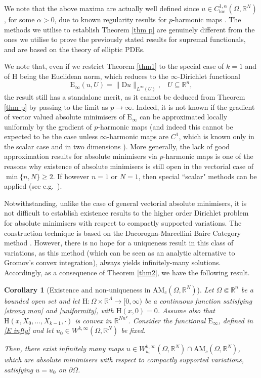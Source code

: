 \documentclass[a4paper,11pt]{article}
\numberwithin{equation}{section}
\newtheorem{Corollary}[Theorem]{Corollary}
\newcommand{\numberset}{\mathbb}
\newcommand{\Om}{\Omega}
\newcommand{\R}{\numberset{R}}
\newcommand{\rom}{\mathrm}
\theoremstyle{definition}
\begin{document}
We note that the above maxima are actually well defined since $u\in C^{1,\alpha}_{\mathrm{loc}}(\Om,\R^N)$, for some $\alpha>0$, due to known regularity results for $p$-harmonic maps \cite{U}. The methods we utilise to establish Theorem \ref{thm p} are genuinely different from the ones we utilise to prove the previously stated results for supremal functionals, and are based on the theory of elliptic PDEs.

We note that, even if we restrict Theorem \ref{thm1} to the special case of $k=1$ and of $\mathrm H$ being the Euclidean norm, which reduces to the $\infty$-Dirichlet functional 
\[
\mathrm E_\infty(u,U)=\|\rom D u\|_{L^\infty(U)},  \ \ \ \ U\subseteq \R^n,
\]
the result still has a standalone merit, as it cannot be deduced from Theorem \ref{thm p} by passing to the limit as $p\to \infty$. Indeed, it is not known if the gradient of vector valued absolute minimisers of $\mathrm E_\infty$ can be approximated locally uniformly by the gradient of $p$-harmonic maps (and indeed this cannot be expected to be the case unless $\infty$-harmonic maps are $C^1$, which is known only in the scalar case and in two dimensions \cite{ES}). More generally, the lack of good approximation results for absolute minimisers via $p$-harmonic maps is one of the reasons why existence of absolute minimisers is still open in the vectorial case of $\min\{n,N\}\geq 2$. If however $n=1$ or $N=1$, then special ``scalar" methods can be applied (see e.g.\ \cite{BJW,AK,K6}).

Notwithstanding, unlike the case of general vectorial absolute minimisers, it is not difficult to establish existence results to the higher order Dirichlet problem for absolute minimisers with respect to compactly supported variations. The construction technique is based on the Dacorogna-Marcellini Baire Category method \cite{D-M}. However, there is no hope for a uniqueness result in this class of variations, as this method (which can be seen as an analytic alternative to Gromov's convex integration), always yields infinitely-many solutions. Accordingly, as a consequence of Theorem \ref{thm2}, we have the following result.



\begin{Corollary}[Existence and non-uniqueness in $\mathrm {AM}_c(\Om,\R^N)$]\label{cor}
Let $\Om\Subset\R^n$ be a bounded open set and let $\rom{H}:\Om\times\R^\Lambda\longrightarrow [0,\infty)$ be a continuous function satisfying \eqref{strong mon} and \eqref{uniformity}, with $\rom{H}(x,0)=0$. Assume also that $\rom H(x,X_0,\ldots,X_{k-1}, \cdot)$ is convex in $\R^{Nn^k}$. Consider the functional $\mathrm E_\infty$, defined in \eqref{E infty} and let $u_0\in W^{k,\infty}(\Om,\R^N)$ be fixed. 

Then, there exist infinitely many maps $u\in W^{k,\infty}_{u_0}(\Om,\R^N)\cap \mathrm{AM}_c(\Om,\R^N)$, which are  absolute minimisers with respect to compactly supported variations, satisfying $u=u_0$ on $\partial \Omega$.
\end{Corollary}
\end{document}
